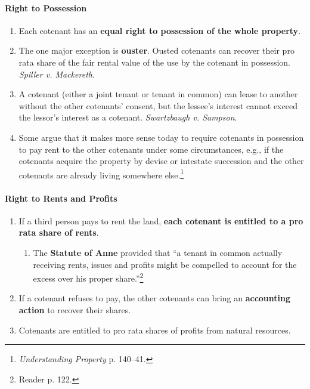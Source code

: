 \paragraph{Right to Possession}

\begin{enumerate}
    \item Each cotenant has an \textbf{equal right to possession of the whole 
    property}.
    \item The one major exception is \textbf{ouster}. Ousted cotenants can 
    recover their pro rata share of the fair rental value of the use by the 
    cotenant in possession. \emph{Spiller v. Mackereth}.
    \item A cotenant (either a joint tenant or tenant in common)  can lease to 
    another without the other cotenants' consent, but the lessee's interest 
    cannot exceed the lessor's interest as a cotenant.  \emph{Swartzbaugh v. 
    Sampson}.
    \item Some argue that it makes more sense today to require cotenants in 
    possession to pay rent to the other cotenants under some circumstances, 
    e.g., if the cotenants acquire the property by devise or intestate 
    succession and the other cotenants are already living somewhere 
    else.\footnote{\emph{Understanding Property} p. 140--41.}
\end{enumerate}

\paragraph{Right to Rents and Profits}

\begin{enumerate}
    \item If a third person pays to rent the land, \textbf{each cotenant is entitled 
    to a pro rata share of rents}.
    \begin{enumerate}
        \item The \textbf{Statute of Anne} provided that ``a tenant in common 
        actually receiving rents, issues and profits might be compelled to 
        account for the excess over his proper share.''\footnote{Reader p. 
        122.}
    \end{enumerate}
    \item If a cotenant refuses to pay, the other cotenants can bring an 
    \textbf{accounting action} to recover their shares.
    \item Cotenants are entitled to pro rata shares of profits from natural 
    resources.
\end{enumerate}

